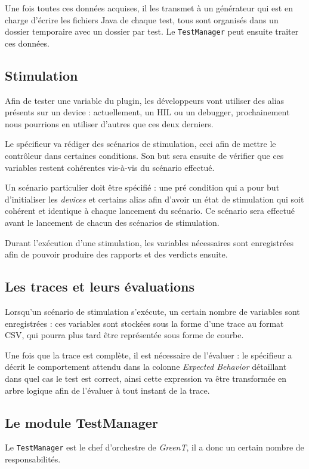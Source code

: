 	Une fois toutes ces données acquises, il les transmet à un générateur qui est en charge d'écrire les fichiers Java de chaque test, tous sont organisés dans un dossier temporaire avec un dossier par test. Le \texttt{TestManager} peut ensuite traiter ces données.

	\subsection{Stimulation} \label{stim}
		Afin de tester une variable du plugin, les développeurs vont utiliser des alias présents sur un device : actuellement, un HIL ou un debugger, prochainement nous pourrions en utiliser d'autres que ces deux derniers.

		Le spécifieur va rédiger des scénarios de stimulation, ceci afin de mettre le contrôleur dans certaines conditions. Son but sera ensuite de vérifier que ces variables restent cohérentes vis-à-vis du scénario effectué. 

		Un scénario particulier doit être spécifié : une pré condition qui a pour but d'initialiser les \textit{devices} et certains alias afin d'avoir un état de stimulation qui soit cohérent et identique à chaque lancement du scénario. Ce scénario sera effectué avant le lancement de chacun des scénarios de stimulation.

		Durant l'exécution d'une stimulation, les variables nécessaires sont enregistrées afin de pouvoir produire des rapports et des
		verdicts ensuite.

	\subsection{Les traces et leurs évaluations}\label{expectedBehavior}
	Lorsqu'un scénario de stimulation s'exécute, un certain nombre de variables sont enregistrées : ces variables sont stockées sous la forme d'une trace au format CSV, qui pourra plus tard être représentée sous forme de courbe. 

	Une fois que la trace est complète, il est nécessaire de l'évaluer : le spécifieur a décrit le comportement attendu dans la colonne \textit{Expected Behavior} détaillant dans quel cas le test est correct, ainsi cette expression va être transformée en arbre logique afin de l'évaluer à tout instant de la trace. 

\subsection{Le module TestManager}\label{testManager}
	Le \texttt{TestManager} est le chef d'orchestre de \textit{GreenT}, il a donc un certain nombre de responsabilités. 

